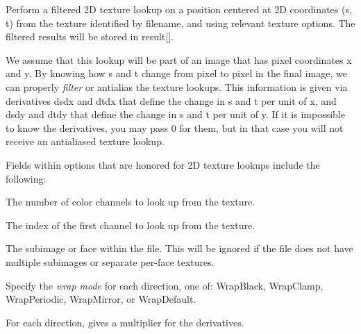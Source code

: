 
Perform a filtered 2D texture lookup on a position centered at 2D
coordinates ({\cf s}, {\cf t}) from the texture identified by
{\cf filename}, and using relevant texture {\cf options}.  The filtered
results will be stored in {\cf result[]}.

We assume that this lookup will be part of an image that has pixel
coordinates {\cf x} and {\cf y}.  By knowing how {\cf s} and {\cf t}
change from pixel to pixel in the final image, we can properly
\emph{filter} or antialias the texture lookups.  This information is
given via derivatives {\cf dsdx} and {\cf dtdx} that define the change
in {\cf s} and {\cf t} per unit of {\cf x}, and {\cf dsdy} and {\cf
  dtdy} that define the change in {\cf s} and {\cf t} per unit of {\cf
  y}.  If it is impossible to know the derivatives, you may pass 0 for
them, but in that case you will not receive an antialiased texture lookup.

Fields within {\cf options} that are honored for 2D texture lookups
include the following:

\vspace{-12pt}
\vspace{10pt}
The number of color channels to look up from the texture.
\apiend

\vspace{-24pt}
\vspace{10pt}
The index of the first channel to look up from the texture.
\apiend

\vspace{-24pt}
\vspace{10pt}
The subimage or face within the file.
This will be ignored if the file does not have multiple subimages or
separate per-face textures.
\apiend

\vspace{-24pt}
\vspace{10pt}
Specify the \emph{wrap mode} for each direction, one of: 
{\cf WrapBlack}, {\cf WrapClamp}, {\cf WrapPeriodic}, {\cf WrapMirror},
or {\cf WrapDefault}.
\apiend

\vspace{-24pt}
\vspace{10pt}
For each direction, gives a multiplier for the derivatives.
\apiend

